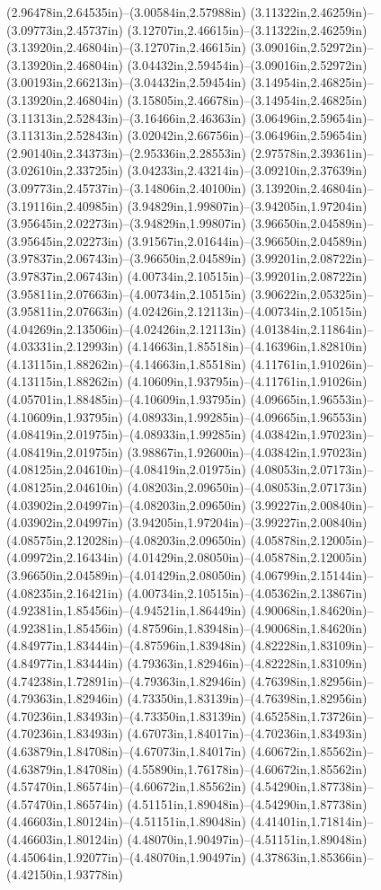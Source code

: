 (2.96478in,2.64535in)--(3.00584in,2.57988in) (3.11322in,2.46259in)--(3.09773in,2.45737in) (3.12707in,2.46615in)--(3.11322in,2.46259in) (3.13920in,2.46804in)--(3.12707in,2.46615in) (3.09016in,2.52972in)--(3.13920in,2.46804in) (3.04432in,2.59454in)--(3.09016in,2.52972in) (3.00193in,2.66213in)--(3.04432in,2.59454in) (3.14954in,2.46825in)--(3.13920in,2.46804in) (3.15805in,2.46678in)--(3.14954in,2.46825in) (3.11313in,2.52843in)--(3.16466in,2.46363in) (3.06496in,2.59654in)--(3.11313in,2.52843in) (3.02042in,2.66756in)--(3.06496in,2.59654in) (2.90140in,2.34373in)--(2.95336in,2.28553in) (2.97578in,2.39361in)--(3.02610in,2.33725in) (3.04233in,2.43214in)--(3.09210in,2.37639in) (3.09773in,2.45737in)--(3.14806in,2.40100in) (3.13920in,2.46804in)--(3.19116in,2.40985in) (3.94829in,1.99807in)--(3.94205in,1.97204in) (3.95645in,2.02273in)--(3.94829in,1.99807in) (3.96650in,2.04589in)--(3.95645in,2.02273in) (3.91567in,2.01644in)--(3.96650in,2.04589in) (3.97837in,2.06743in)--(3.96650in,2.04589in) (3.99201in,2.08722in)--(3.97837in,2.06743in) (4.00734in,2.10515in)--(3.99201in,2.08722in) (3.95811in,2.07663in)--(4.00734in,2.10515in) (3.90622in,2.05325in)--(3.95811in,2.07663in) (4.02426in,2.12113in)--(4.00734in,2.10515in) (4.04269in,2.13506in)--(4.02426in,2.12113in) (4.01384in,2.11864in)--(4.03331in,2.12993in) (4.14663in,1.85518in)--(4.16396in,1.82810in) (4.13115in,1.88262in)--(4.14663in,1.85518in) (4.11761in,1.91026in)--(4.13115in,1.88262in) (4.10609in,1.93795in)--(4.11761in,1.91026in) (4.05701in,1.88485in)--(4.10609in,1.93795in) (4.09665in,1.96553in)--(4.10609in,1.93795in) (4.08933in,1.99285in)--(4.09665in,1.96553in) (4.08419in,2.01975in)--(4.08933in,1.99285in) (4.03842in,1.97023in)--(4.08419in,2.01975in) (3.98867in,1.92600in)--(4.03842in,1.97023in) (4.08125in,2.04610in)--(4.08419in,2.01975in) (4.08053in,2.07173in)--(4.08125in,2.04610in) (4.08203in,2.09650in)--(4.08053in,2.07173in) (4.03902in,2.04997in)--(4.08203in,2.09650in) (3.99227in,2.00840in)--(4.03902in,2.04997in) (3.94205in,1.97204in)--(3.99227in,2.00840in) (4.08575in,2.12028in)--(4.08203in,2.09650in) (4.05878in,2.12005in)--(4.09972in,2.16434in) (4.01429in,2.08050in)--(4.05878in,2.12005in) (3.96650in,2.04589in)--(4.01429in,2.08050in) (4.06799in,2.15144in)--(4.08235in,2.16421in) (4.00734in,2.10515in)--(4.05362in,2.13867in) (4.92381in,1.85456in)--(4.94521in,1.86449in) (4.90068in,1.84620in)--(4.92381in,1.85456in) (4.87596in,1.83948in)--(4.90068in,1.84620in) (4.84977in,1.83444in)--(4.87596in,1.83948in) (4.82228in,1.83109in)--(4.84977in,1.83444in) (4.79363in,1.82946in)--(4.82228in,1.83109in) (4.74238in,1.72891in)--(4.79363in,1.82946in) (4.76398in,1.82956in)--(4.79363in,1.82946in) (4.73350in,1.83139in)--(4.76398in,1.82956in) (4.70236in,1.83493in)--(4.73350in,1.83139in) (4.65258in,1.73726in)--(4.70236in,1.83493in) (4.67073in,1.84017in)--(4.70236in,1.83493in) (4.63879in,1.84708in)--(4.67073in,1.84017in) (4.60672in,1.85562in)--(4.63879in,1.84708in) (4.55890in,1.76178in)--(4.60672in,1.85562in) (4.57470in,1.86574in)--(4.60672in,1.85562in) (4.54290in,1.87738in)--(4.57470in,1.86574in) (4.51151in,1.89048in)--(4.54290in,1.87738in) (4.46603in,1.80124in)--(4.51151in,1.89048in) (4.41401in,1.71814in)--(4.46603in,1.80124in) (4.48070in,1.90497in)--(4.51151in,1.89048in) (4.45064in,1.92077in)--(4.48070in,1.90497in) (4.37863in,1.85366in)--(4.42150in,1.93778in) 